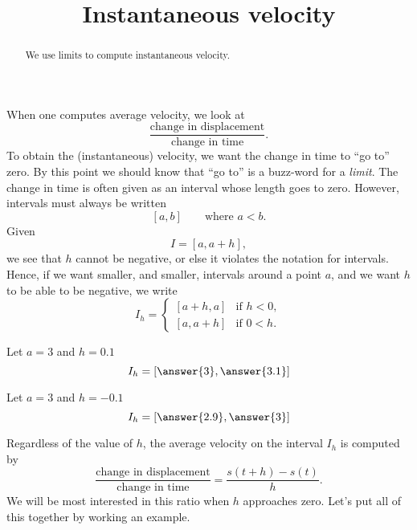 \documentclass{ximera}
\title[Dig-In:]{Instantaneous velocity}
\begin{document}
\begin{abstract}
We use limits to compute instantaneous velocity.
\end{abstract}
\maketitle

When one computes average velocity, we look at 
\[
\frac{\text{change in displacement}}{\text{change in time}}.
\]
To obtain the (instantaneous) velocity, we want the change in time to
``go to'' zero. By this point we should know that ``go to'' is a
buzz-word for a \textit{limit}. The change in time is often given as
an interval whose length goes to zero.  However, intervals must always
be written
\[
[a,b] \qquad\text{where $a < b$.}
\]
Given
\[
I = [a, a+h],
\]
we see that $h$ cannot be negative, or else it violates the notation
for intervals. Hence, if we want smaller, and smaller, intervals
around a point $a$, and we want $h$ to be able to be negative, we
write
\[
I_h = 
\begin{cases}
  [a+h,a]  & \text{if $h<0$}, \\ %
  [a,a+h]  & \text{if $0<h$}.     %
\end{cases}
\]
\begin{question}
  Let $a = 3$ and $h = 0.1$
  \[
  I_h = \left[\answer{3},\answer{3.1} \right]
  \]
  \begin{question}
    Let $a = 3$ and $h = -0.1$
  \[
  I_h = \left[\answer{2.9},\answer{3} \right]
  \]
  \end{question}
\end{question}

Regardless of the value of $h$, the average velocity on the interval
$I_h$ is computed by
\[
\frac{\text{change in displacement}}{\text{change in time}} =
\frac{s(t+h)-s(t)}{h}.
\]
We will be most interested in this ratio when $h$ approaches zero.
Let's put all of this together by working an example.
\end{document}
